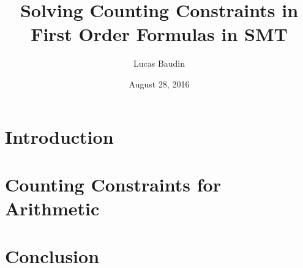 \documentclass[]{article}
\title{Solving Counting Constraints in First Order Formulas in SMT}
\date{August 28, 2016}
\author{Lucas Baudin}
\begin{document}
\maketitle

{
\setcounter{tocdepth}{3}
\tableofcontents
}

\newtheorem{definition}{Definition} \newtheorem{lemma}{Lemma}
\newtheorem{theorem}{Theorem} \newtheorem{property}{Property}


\newpage

\section*{Introduction}\label{introduction}
\label{sec:intro}


\section{Counting Constraints for Arithmetic}
\label{sec:arith}



\newpage
\section*{Conclusion}
\label{sec:conclusion}




\end{document}
